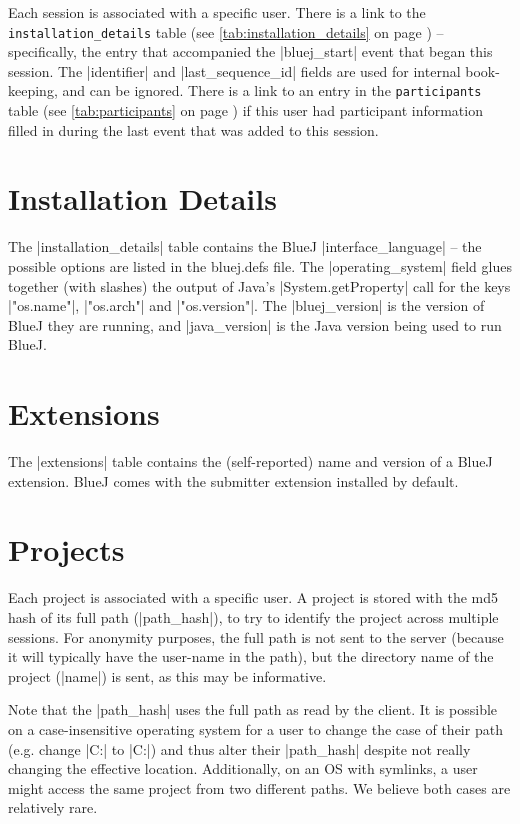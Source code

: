 \documentclass{report}
\newcommand{\myref}[1]{\autoref{#1} on page \pageref*{#1}}
\newcommand{\tabref}[1]{\lstinline|#1| table (see \myref{tab:#1})}
\newcommand{\intern}{This table may be interned, see \myref{def:intern}.}
\begin{document}
Each session is associated with a specific user.  There is a link to
the \tabref{installation_details} -- specifically, the entry that
accompanied the |bluej_start| event that began this session.  The
|identifier| and |last_sequence_id| fields are used for internal
book-keeping, and can be ignored.  There is a link to an entry in the
\tabref{participants} if this user had participant information filled in
during the last event that was added to this session.

\section{Installation Details}


The |installation_details| table contains the BlueJ |interface_language| -- the
possible options are listed in the bluej.defs file.  The |operating_system|
field glues together (with slashes) the output of Java's |System.getProperty|
call for the keys |"os.name"|, |"os.arch"| and |"os.version"|.  The
|bluej_version| is the version of BlueJ they are running, and |java_version|
is the Java version being used to run BlueJ.

\section{Extensions}


The |extensions| table contains the (self-reported) name and version of a
BlueJ extension.  BlueJ comes with the submitter extension installed by default.

\section{Projects}


Each project is associated with a specific user.  A project is stored with the
md5 hash of its full path (|path_hash|), to try to identify the project across multiple
sessions.  For anonymity purposes, the full path is not sent to the server
(because it will typically have the user-name in the path), but the directory
name of the project (|name|) is sent, as this may be informative.

Note that the |path_hash| uses the full path as read by the client.  It is possible on
a case-insensitive operating system for a user to change the case of their path (e.g. change
|C:\BLUEJPROJ{}| to |C:\BlueJproj{}|) and thus alter their |path_hash| despite not
really changing the effective location.  Additionally, on an OS with symlinks, a user might
access the same project from two different paths.  We believe both cases are relatively rare.
\end{document}
